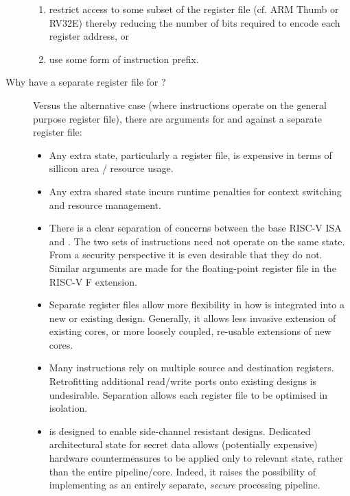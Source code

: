 \begin{description}
      \begin{enumerate}
      \item restrict access to some subset of the register file 
            (cf. ARM Thumb or RV32E) 
            thereby reducing the number of bits required to encode each  
            register address,
            or
      \item use some form of instruction prefix.
      \end{enumerate}

\item[Why have a separate register file for \XCID?]
      Versus the alternative case (where \XCID instructions operate on
      the general purpose register file), there are arguments
      for and against a separate register file:
    
      \begin{itemize}
      \item Any extra state, particularly a register file, is expensive in terms of
            sillicon area / resource usage.
      \item Any extra shared state incurs runtime penalties for context switching
            and resource management.
      \item There is a clear separation of concerns between the base RISC-V ISA
            and \XCID. The two sets of instructions need not operate on the same
            state.
            From a security perspective it is even desirable that they do not.
            Similar arguments are made for the floating-point register file in
            the RISC-V F extension.
      \item Separate register files allow more flexibility in how
            \XCID is integrated into a new or existing design. Generally, it
            allows less invasive extension of existing cores, or more
            loosely coupled, re-usable extensions of new cores.
      \item Many \XCID instructions rely on multiple source and destination
            registers. Retrofitting additional read/write ports onto
            existing designs is undesirable. Separation allows each register file
            to be optimised in isolation.
      \item \XCID is designed to enable side-channel resistant designs.
            Dedicated architectural state for secret data allows
            (potentially expensive) hardware countermeasures to be applied only
            to relevant state, rather than the entire pipeline/core.
            Indeed, it raises the possibility of implementing \XCID as an
            entirely separate, {\em secure} processing pipeline.
      \end{itemize}



\end{description}
